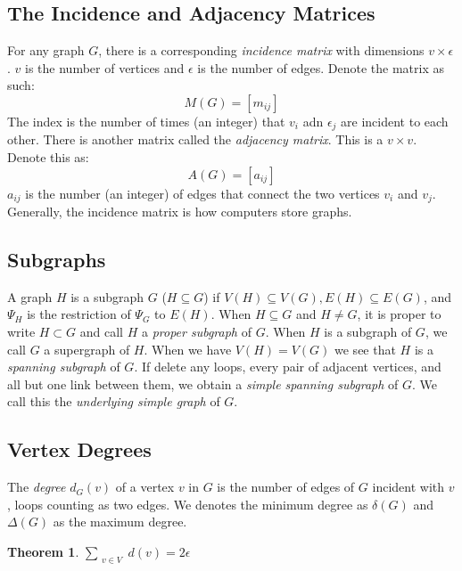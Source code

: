 \documentclass{article}
\newtheorem{theorem}{Theorem}
\begin{document}
\subsection{The Incidence and Adjacency Matrices}
\indent{} For any graph $G$, there is a corresponding \emph{incidence matrix} with dimensions $v \times \epsilon$. $v$ is the number of vertices and $\epsilon$ is the number of edges.
Denote the matrix as such:
\[M(G) = [m_{ij}]\]
\indent{} The index is the number of times (an integer) that $v_i$ adn $\epsilon_j$ are incident to each other. There is another matrix called the \emph{adjacency matrix}. This is a $v \times v$.
Denote this as:
\[A(G) = [a_{ij}]\]
\indent{} $a_{ij}$ is the number (an integer) of edges that connect the two vertices $v_i$ and $v_j$. Generally, the incidence matrix is how computers store graphs.

\subsection{Subgraphs}
\indent{}A graph $H$ is a subgraph $G$ ($H \subseteq G$) if $V(H) \subseteq V(G), E(H) \subseteq E(G)$, and $\Psi_H$ is the restriction of $\Psi_G$ to $E(H)$. 
When $H \subseteq G$ and $H \neq G$, it is proper to write $H \subset G$ and call $H$ a \emph{proper subgraph} of $G$. When $H$ is a subgraph of $G$, we call $G$ a supergraph of $H$. When 
we have $V(H) = V(G)$ we see that $H$ is a \emph{spanning subgraph} of $G$. If delete any loops, every pair of adjacent vertices,  and all but one link between them, we obtain a \emph{simple spanning subgraph} of $G$. 
We call this the \emph{underlying simple graph} of $G$.

\subsection{Vertex Degrees}
\indent{} The \emph{degree} $d_G(v)$ of a vertex $v$ in $G$ is the number of edges of $G$ incident with $v$, loops counting as two edges. We denotes the minimum degree as $\delta(G)$ and $\Delta(G)$ as the maximum degree.

\begin{theorem}
    $\sum_{\substack{v \in V}} d(v) = 2 \epsilon$
\end{theorem}
\end{document}
